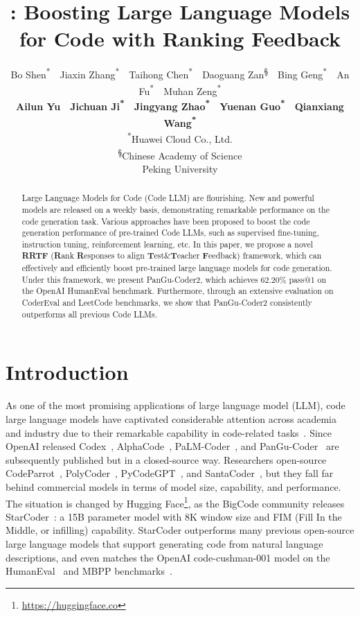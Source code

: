 \documentclass{article}
\title{\pgcoder: Boosting Large Language Models for Code with Ranking Feedback }
\author{
Bo Shen\textsuperscript{*}~~Jiaxin Zhang\textsuperscript{*}~~Taihong Chen\textsuperscript{*}~~Daoguang Zan\textsuperscript{\S}~~Bing Geng\textsuperscript{*}~~An Fu\textsuperscript{*}~~Muhan Zeng\textsuperscript{*} \\ 
\textbf{Ailun Yu\textsuperscript{\dag}}~~\textbf{Jichuan Ji\textsuperscript{*}}~~\textbf{Jingyang Zhao\textsuperscript{*}}~~\textbf{Yuenan Guo\textsuperscript{*}}~~\textbf{Qianxiang Wang\textsuperscript{*}}
\\
\textsuperscript{*}Huawei Cloud Co., Ltd.\\
\textsuperscript{\S}Chinese Academy of Science \\
\textsuperscript{\dag}Peking University
}
\date{}
\newcommand{\pgcoder}{PanGu-Coder2\xspace}
\begin{document}
\maketitle

\begin{abstract}
Large Language Models for Code (Code LLM) are flourishing. New and powerful models are released on a weekly basis, demonstrating remarkable performance on the code generation task.
Various approaches have been proposed to boost the code generation performance of pre-trained Code LLMs, such as supervised fine-tuning, instruction tuning, reinforcement learning, etc.
In this paper, we propose a novel \textbf{RRTF} (\textbf{R}ank \textbf{R}esponses to align \textbf{T}est\&\textbf{T}eacher \textbf{F}eedback) framework, which can effectively and efficiently boost pre-trained large language models for code generation. Under this framework, we present \pgcoder, which achieves 62.20\% pass@1 on the OpenAI HumanEval benchmark.
Furthermore, through an extensive evaluation on CoderEval and LeetCode benchmarks, we show that \pgcoder consistently outperforms all previous Code LLMs.

\end{abstract}




\section{Introduction}
As one of the most promising applications of large language model (LLM), code large language models have captivated considerable attention across academia and industry due to their remarkable capability in code-related tasks~\cite{zan2022neural}.
Since OpenAI released Codex~\cite{codex}, AlphaCode~\cite{alphacode}, PaLM-Coder~\cite{palm}, and PanGu-Coder~\cite{pangu-coder} are subsequently published but in a closed-source way. Researchers open-source CodeParrot~\cite{codeparrot}, PolyCoder~\cite{polycoder}, PyCodeGPT~\cite{cert}, and SantaCoder~\cite{santacoder}, but they fall far behind commercial models in terms of model size, capability, and performance.
The situation is changed by Hugging Face\footnote{\url{https://huggingface.co}}, as the BigCode community releases StarCoder~\cite{starcoder}: a 15B parameter model with 8K window size and FIM (Fill In the Middle, or infilling) capability. StarCoder outperforms many previous open-source large language models that support generating code from natural language descriptions, and even matches the OpenAI code-cushman-001 model on the HumanEval~\cite{codex} and MBPP benchmarks~\cite{mbpp}.
\end{document}
